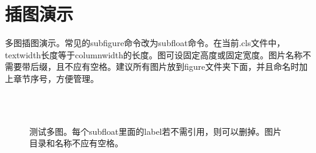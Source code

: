 \documentclass[unicode,pdfcover]{scutthesis}
\begin{document}
\section{插图演示}
多图插图演示。常见的subfigure命令改为subfloat命令。在当前.cls文件中，textwidth长度等于columnwidth的长度。图可设固定高度或固定宽度。图片名称不需要带后缀，且不应有空格。建议所有图片放到figure文件夹下面，并且命名时加上章节序号，方便管理。
\begin{figure}[htp]%
  \centering%
  \hspace{5mm}%
  \\%
  \hspace{5mm}
  \\
  \caption{测试多图。每个subfloat里面的label若不需引用，则可以删掉。图片目录和名称不应有空格。}
  \label{FIG-3-CM}
\end{figure}
\end{document}

